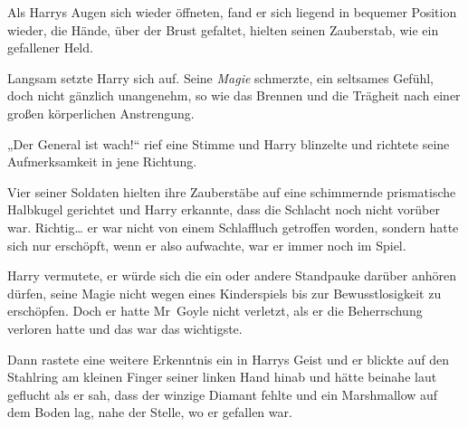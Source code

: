 \later

Als Harrys Augen sich wieder öffneten, fand er sich liegend in bequemer Position wieder, die Hände, über der Brust gefaltet, hielten seinen Zauberstab, wie ein gefallener Held.

Langsam setzte Harry sich auf. Seine \emph{Magie} schmerzte, ein seltsames Gefühl, doch nicht gänzlich unangenehm, so wie das Brennen und die Trägheit nach einer großen körperlichen Anstrengung.

„Der General ist wach!“ rief eine Stimme und Harry blinzelte und richtete seine Aufmerksamkeit in jene Richtung.

Vier seiner Soldaten hielten ihre Zauberstäbe auf eine schimmernde prismatische Halbkugel gerichtet und Harry erkannte, dass die Schlacht noch nicht vorüber war. Richtig… er war nicht von einem Schlaffluch getroffen worden, sondern hatte sich nur erschöpft, wenn er also aufwachte, war er immer noch im Spiel.

Harry vermutete, er würde sich die ein oder andere Standpauke darüber anhören dürfen, seine Magie nicht wegen eines Kinderspiels bis zur Bewusstlosigkeit zu erschöpfen. Doch er hatte Mr~Goyle nicht verletzt, als er die Beherrschung verloren hatte und das war das wichtigste.

Dann rastete eine weitere Erkenntnis ein in Harrys Geist und er blickte auf den Stahlring am kleinen Finger seiner linken Hand hinab und hätte beinahe laut geflucht als er sah, dass der winzige Diamant fehlte und ein Marshmallow auf dem Boden lag, nahe der Stelle, wo er gefallen war.


